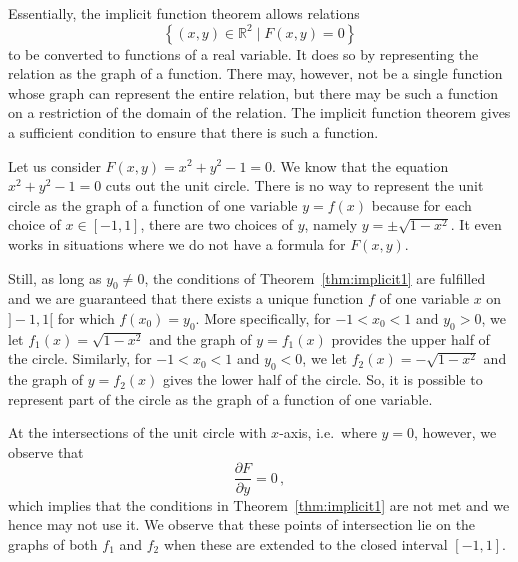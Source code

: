 Essentially, the implicit function theorem allows relations 
$$\left\{(x,y)\in\mathbb{R}^2\mid F(x,y)=0\right\}$$
 to be converted to functions of a real variable. It does so by representing the relation as the graph of a function. There may, however, not be a single function whose graph can represent the entire relation, but there may be such a function on a restriction of the domain of the relation. The implicit function theorem gives a sufficient condition to ensure that there is such a function. 

\begin{example}
Let us consider  $\displaystyle F(x,y)=x^{2}+y^{2}-1=0$. We know that the equation $x^{2}+y^{2}-1=0$  cuts out the unit circle. There is no way to represent the unit circle as the graph of a function of one variable $y = f(x)$ because for each choice of $x\in[-1,1]$, there are two choices of $y$, namely $y= \pm {\sqrt {1-x^{2}}}$. It even works in situations where we do not have a formula for $F(x, y)$. 

Still, as long as $y_0\neq 0$, the conditions of Theorem~\ref{thm:implicit1} are fulfilled and we are guaranteed that there exists a unique function $f$ of one variable $x$ on $]-1,1[$ for which $f(x_0)=y_0$.   More specifically, for $-1 < x_0 < 1$ and $y_0>0$,  we let $f_{1}(x)={\sqrt {1-x^{2}}}$  and the graph of $y=f_{1}(x)$ provides the upper half of the circle. Similarly, for $-1 < x_0 < 1$ and $y_0<0$, we let $f_{2}(x)=-{\sqrt {1-x^{2}}}$ and the graph of $y=f_{2}(x)$ gives the lower half of the circle. So, it is possible to represent part of the circle as the graph of a function of one variable.

At the intersections  of the unit circle with $x$-axis, i.e.\ where $y=0$, however, we observe that 
$$
\dfrac{\partial F}{\partial y}=0\,,
$$
which implies that the conditions in Theorem~\ref{thm:implicit1} are not met and we hence may not use it. We observe that these points of intersection lie on the graphs of both $f_1$ and $f_2$ when these are extended to the closed interval $[-1,1]$.


\end{example}

